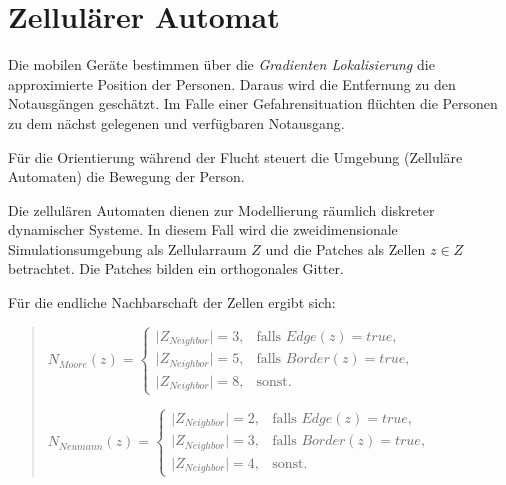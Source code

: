 \section{Zellul\"arer Automat}
\label{sec:cellular_automaton}


Die mobilen Geräte bestimmen über die \emph{Gradienten Lokalisierung} die approximierte Position der Personen. Daraus wird die Entfernung zu den Notausgängen geschätzt. Im Falle einer Gefahrensituation flüchten die Personen zu dem nächst gelegenen und verfügbaren Notausgang.

Für die Orientierung während der Flucht steuert die Umgebung (Zelluläre Automaten) die Bewegung der Person.

Die zellulären Automaten dienen zur Modellierung räumlich diskreter dynamischer Systeme. In diesem Fall wird die zweidimensionale Simulationsumgebung als Zellularraum $Z$ und die Patches als Zellen $z \in Z$ betrachtet. Die Patches bilden ein orthogonales Gitter.

Für die endliche Nachbarschaft der Zellen ergibt sich:

\begin{quote}
$ N_{Moore}(z)=\left\{\begin{array}{cl} \vert Z_{Neighbor}\vert = 3, & \mbox{falls }Edge(z) = true,\\ \vert Z_{Neighbor}\vert = 5, & \mbox{falls }Border(z) = true,\\ \vert Z_{Neighbor}\vert = 8, & \mbox{sonst.} \end{array}\right. $

$ N_{Neumann}(z)=\left\{\begin{array}{cl} \vert Z_{Neighbor}\vert = 2, & \mbox{falls }Edge(z) = true,\\ \vert Z_{Neighbor}\vert = 3, & \mbox{falls }Border(z) = true,\\ \vert Z_{Neighbor}\vert = 4, & \mbox{sonst.} \end{array}\right. $
\end{quote}

